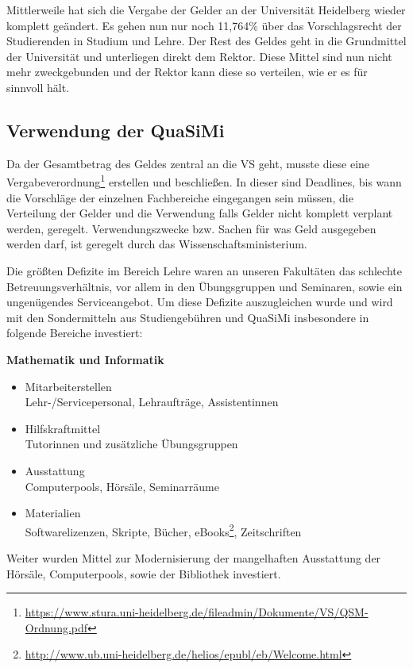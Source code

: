 Mittlerweile hat sich die Vergabe der Gelder an der Universität Heidelberg wieder komplett geändert. Es gehen nun nur noch 11,764\% über das Vorschlagsrecht der Studierenden in Studium und Lehre. Der Rest des Geldes geht in die Grundmittel der Universität und unterliegen direkt dem Rektor. Diese Mittel sind nun nicht mehr zweckgebunden und der Rektor kann diese so verteilen, wie er es für sinnvoll hält. 


\subsection{Verwendung der QuaSiMi}
Da der Gesamtbetrag des Geldes zentral an die VS geht, musste diese eine Vergabeverordnung\footnote{\url{https://www.stura.uni-heidelberg.de/fileadmin/Dokumente/VS/QSM-Ordnung.pdf}} erstellen und beschließen. In dieser sind Deadlines, bis wann die Vorschläge der einzelnen Fachbereiche eingegangen sein müssen, die Verteilung der Gelder und die Verwendung falls Gelder nicht komplett verplant werden, geregelt. Verwendungszwecke bzw. Sachen für was Geld ausgegeben werden darf, ist geregelt durch das Wissenschaftsministerium.

Die größten Defizite im Bereich Lehre waren an unseren Fakultäten das schlechte Betreuungsverhältnis, vor allem in den Übungsgruppen und Seminaren, sowie ein ungenügendes Serviceangebot. Um diese Defizite auszugleichen wurde und wird mit den Sondermitteln aus Studiengebühren und QuaSiMi insbesondere in folgende Bereiche investiert:

\vspace{5mm}
\textbf{Mathematik und Informatik}
\begin{itemize}
 \item {Mitarbeiterstellen}\\Lehr-/Servicepersonal, Lehraufträge, Assistentinnen
\item {Hilfskraftmittel}\\ Tutorinnen und zusätzliche Übungsgruppen
\item {Ausstattung}\\ Computerpools, Hörsäle, Seminarräume
\item {Materialien}\\ Softwarelizenzen, Skripte, Bücher, eBooks\footnote{\url{http://www.ub.uni-heidelberg.de/helios/epubl/eb/Welcome.html}}, Zeitschriften
\end{itemize}

Weiter wurden Mittel zur Modernisierung der mangelhaften Ausstattung der Hörsäle, Computerpools, sowie der Bibliothek investiert.


